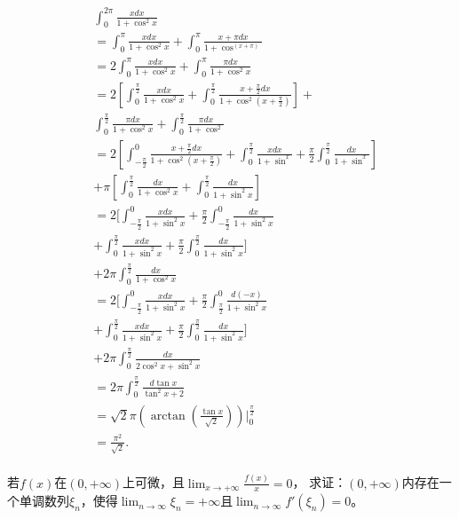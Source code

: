   \begin{solution}
    \begin{align*}
    &\int_0^{2\pi }\frac{x dx}{1+\cos^2x}\\&=\int_0^{\pi}\frac{x dx}{1+\cos^2x}+\int_0^{\pi}\frac{x+\pi dx}{1+\cos^(x+\pi)}\\
    &=2\int_0^{\pi}\frac{xdx}{1+\cos^2x}+\int_0^{\pi}\frac{\pi dx}{1+\cos^2x}\\
    &=2[\int_0^{\frac{\pi}{2}}\frac{xdx}{1+\cos^2x}+\int_0^{\frac{\pi}{2}}\frac{x+\frac{\pi}{2}dx}{1+\cos^2(x+\frac{\pi}{2})}]+\\
    &\int_0^{\frac{\pi}{2}}\frac{\pi dx}{1+\cos^2x}+\int_0^{\frac{\pi}{2}}\frac{\pi dx}{1+\cos^2}\\
    &=2[\int_{-\frac{\pi}{2}}^0\frac{x+\frac{\pi}2dx}{1+\cos^2(x+\frac{\pi}{2})}+\int_0^{\frac{\pi}{2}}\frac{xdx}{1+\sin^x}+\frac{\pi}{2}\int_0^{\frac{\pi}{2}}\frac{dx}{1+\sin^x}]\\
    &+\pi[\int_0^{\frac{\pi}{2}}\frac{dx}{1+\cos^2x}+\int_0^{\frac{\pi}{2}}\frac{dx}{1+\sin^2x}]\\
    &=2[\int_{-\frac{\pi}{2}}^0\frac{xdx}{1+\sin^2x}+\frac{\pi}{2}\int_{-\frac{\pi}{2}}^0\frac{dx}{1+\sin^2x}\\
    &+\int_0^{\frac{\pi}{2}}\frac{xdx}{1+\sin^2x}+\frac{\pi}{2}\int_0^{\frac{\pi}{2}}\frac{dx}{1+\sin^2x}]\\
    &+2\pi\int_0^{\frac{\pi}{2}}\frac{dx}{1+\cos^2x}\\
    &=2[\int_{-\frac{\pi}{2}}^0\frac{xdx}{1+\sin^2x}+\frac{\pi}{2}\int_{\frac{\pi}{2}}^0\frac{d(-x)}{1+\sin^2x}\\
    &+\int_0^{\frac{\pi}{2}}\frac{xdx}{1+\sin^2x}+\frac{\pi}{2}\int_0^{\frac{\pi}{2}}\frac{dx}{1+\sin^2x}]\\
    &+2\pi\int_0^{\frac{\pi}{2}}\frac{dx}{2\cos^2x+\sin^2x}\\
    &=2\pi\int_0^{\frac{\pi}{2}}\frac{d\tan x}{\tan^2x+2}\\
    &=\sqrt{2}\pi(\arctan(\frac{\tan x}{\sqrt{2}}))|_0^{\frac{\pi}{2}}\\
    &=\frac{\pi^2}{\sqrt{2}}.\\
  \end{align*}
  \end{solution}
  
  \begin{example}
  若$f(x)$在$(0,+\infty)$上可微，且$\lim_{x\rightarrow+\infty}\frac{f(x)}x=0$，
  求证：$(0,+\infty)$内存在一个单调数列${\xi_n}$，使得$\lim_{n\rightarrow\infty}\xi_n=+\infty$且$\lim_{n\rightarrow\infty}f'(\xi_n)=0$。
  \end{example}
  
